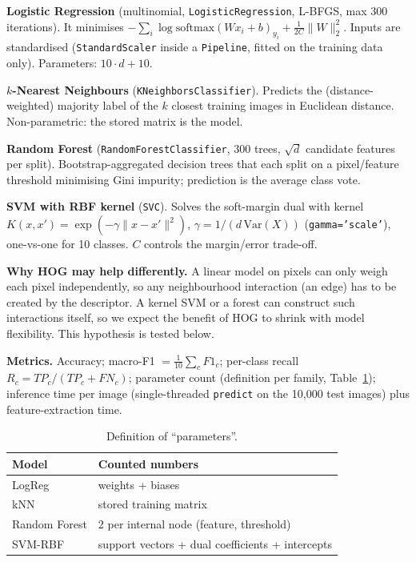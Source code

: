 \documentclass[conference]{IEEEtran}
\begin{document}
\textbf{Logistic Regression} (multinomial, \texttt{LogisticRegression}, L-BFGS, max 300 iterations). It minimises $-\sum_i\log\mathrm{softmax}(Wx_i+b)_{y_i}+\frac{1}{2C}\|W\|_2^2$. Inputs are standardised (\texttt{StandardScaler} inside a \texttt{Pipeline}, fitted on the training data only). Parameters: $10\cdot d+10$.

\textbf{$k$-Nearest Neighbours} (\texttt{KNeighborsClassifier}). Predicts the (distance-weighted) majority label of the $k$ closest training images in Euclidean distance. Non-parametric: the stored matrix is the model.

\textbf{Random Forest} (\texttt{RandomForestClassifier}, 300 trees, $\sqrt d$ candidate features per split). Bootstrap-aggregated decision trees that each split on a pixel/feature threshold minimising Gini impurity; prediction is the average class vote.

\textbf{SVM with RBF kernel} (\texttt{SVC}). Solves the soft-margin dual with kernel $K(x,x')=\exp(-\gamma\|x-x'\|^2)$, $\gamma=1/(d\,\mathrm{Var}(X))$ (\texttt{gamma='scale'}), one-vs-one for 10 classes. $C$ controls the margin/error trade-off.

\textbf{Why HOG may help differently.} A linear model on pixels can only weigh each pixel independently, so any neighbourhood interaction (an edge) has to be created by the descriptor. A kernel SVM or a forest can construct such interactions itself, so we expect the benefit of HOG to shrink with model flexibility. This hypothesis is tested below.

\textbf{Metrics.} Accuracy; macro-F1 $=\frac1{10}\sum_c F1_c$; per-class recall $R_c=TP_c/(TP_c+FN_c)$; parameter count (definition per family, Table~\ref{tab:params}); inference time per image (single-threaded \texttt{predict} on the 10{,}000 test images) plus feature-extraction time.

\begin{table}[t]\centering\caption{Definition of ``parameters''.}\label{tab:params}
\begin{tabular}{@{}ll@{}}\toprule Model & Counted numbers\\\midrule
LogReg & weights + biases\\
kNN & stored training matrix\\
Random Forest & 2 per internal node (feature, threshold)\\
SVM-RBF & support vectors + dual coefficients + intercepts\\\bottomrule\end{tabular}\end{table}
\end{document}
